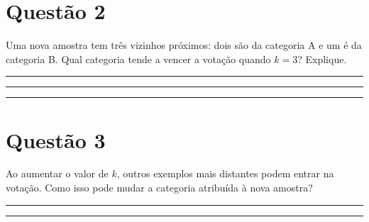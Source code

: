 \documentclass[12pt,a4paper]{article}
\newcommand{\linha}{\rule{\linewidth}{0.35pt}}
\begin{document}
\section*{Questão 2}

Uma nova amostra tem três vizinhos próximos: dois são da categoria A e um é da categoria B. Qual categoria tende a vencer a votação quando $k=3$? Explique.

\vspace{0.25em}
\linha\par\vspace{0.75em}
\linha\par\vspace{0.75em}
\linha

\section*{Questão 3}

Ao aumentar o valor de $k$, outros exemplos mais distantes podem entrar na votação. Como isso pode mudar a categoria atribuída à nova amostra?

\vspace{0.25em}
\linha\par\vspace{0.75em}
\linha
\end{document}
